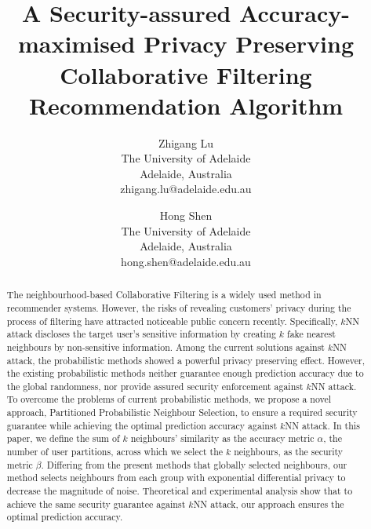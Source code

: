 \documentclass[11pt]{article}
\begin{document}
\newtheorem{definition}{Definition}[]
\renewcommand{\algorithmicrequire}{\textbf{Input:}}
\renewcommand{\algorithmicensure}{\textbf{Output:}}
\title{A Security-assured Accuracy-maximised Privacy Preserving Collaborative Filtering Recommendation Algorithm}
\date{}

\author{
Zhigang Lu\\
       The University of Adelaide\\
       Adelaide, Australia\\
       zhigang.lu@adelaide.edu.au
\and
Hong Shen\\
			The University of Adelaide\\
			Adelaide, Australia\\
			hong.shen@adelaide.edu.au}

\maketitle
~\\
\begin{abstract}
The neighbourhood-based Collaborative Filtering is a widely used method in recommender systems. However, the risks of revealing customers' privacy during the process of filtering have attracted noticeable public concern recently. Specifically, $k$NN attack discloses the target user's sensitive information by creating $k$ fake nearest neighbours by non-sensitive information. Among the current solutions against $k$NN attack, the probabilistic methods showed a powerful privacy preserving effect. However, the existing probabilistic methods neither guarantee enough prediction accuracy due to the global randomness, nor provide assured security enforcement against $k$NN attack. To overcome the problems of current probabilistic methods, we propose a novel approach, Partitioned Probabilistic Neighbour Selection, to ensure a required security guarantee while achieving the optimal prediction accuracy against $k$NN attack. In this paper, we define the sum of $k$ neighbours' similarity as the accuracy metric $\alpha$, the number of user partitions, across which we select the $k$ neighbours, as the security metric $\beta$. Differing from the present methods that globally selected neighbours, our method selects neighbours from each group with exponential differential privacy to decrease the magnitude of noise. Theoretical and experimental analysis show that to achieve the same security guarantee against $k$NN attack, our approach ensures the optimal prediction accuracy.
\end{abstract}
~\\
\end{document}
